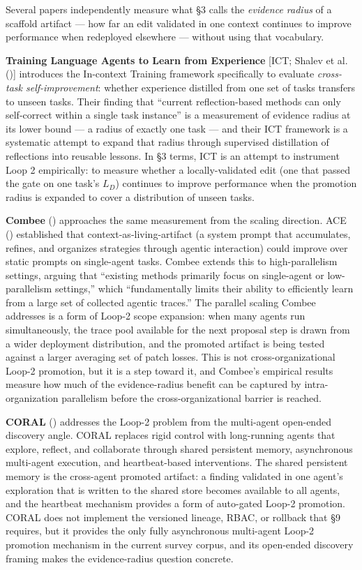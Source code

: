 \documentclass[
]{article}
\begin{document}
Several papers independently measure what §3 calls the \emph{evidence
radius} of a scaffold artifact --- how far an edit validated in one
context continues to improve performance when redeployed elsewhere ---
without using that vocabulary.

\textbf{Training Language Agents to Learn from Experience} {[}ICT;
Shalev et al. (){]} introduces the
In-context Training framework specifically to evaluate \emph{cross-task
self-improvement}: whether experience distilled from one set of tasks
transfers to unseen tasks. Their finding that ``current reflection-based
methods can only self-correct within a single task instance'' is a
measurement of evidence radius at its lower bound --- a radius of
exactly one task --- and their ICT framework is a systematic attempt to
expand that radius through supervised distillation of reflections into
reusable lessons. In §3 terms, ICT is an attempt to instrument Loop 2
empirically: to measure whether a locally-validated edit (one that
passed the gate on one task's \(L_D\)) continues to improve performance
when the promotion radius is expanded to cover a distribution of unseen
tasks.

\textbf{Combee} () approaches
the same measurement from the scaling direction. ACE
() established that
context-as-living-artifact (a system prompt that accumulates, refines,
and organizes strategies through agentic interaction) could improve over
static prompts on single-agent tasks. Combee extends this to
high-parallelism settings, arguing that ``existing methods primarily
focus on single-agent or low-parallelism settings,'' which
``fundamentally limits their ability to efficiently learn from a large
set of collected agentic traces.'' The parallel scaling Combee addresses
is a form of Loop-2 scope expansion: when many agents run
simultaneously, the trace pool available for the next proposal step is
drawn from a wider deployment distribution, and the promoted artifact is
being tested against a larger averaging set of patch losses. This is not
cross-organizational Loop-2 promotion, but it is a step toward it, and
Combee's empirical results measure how much of the evidence-radius
benefit can be captured by intra-organization parallelism before the
cross-organizational barrier is reached.

\textbf{CORAL} () addresses
the Loop-2 problem from the multi-agent open-ended discovery angle.
CORAL replaces rigid control with long-running agents that explore,
reflect, and collaborate through shared persistent memory, asynchronous
multi-agent execution, and heartbeat-based interventions. The shared
persistent memory is the cross-agent promoted artifact: a finding
validated in one agent's exploration that is written to the shared store
becomes available to all agents, and the heartbeat mechanism provides a
form of auto-gated Loop-2 promotion. CORAL does not implement the
versioned lineage, RBAC, or rollback that §9 requires, but it provides
the only fully asynchronous multi-agent Loop-2 promotion mechanism in
the current survey corpus, and its open-ended discovery framing makes
the evidence-radius question concrete.
\end{document}
